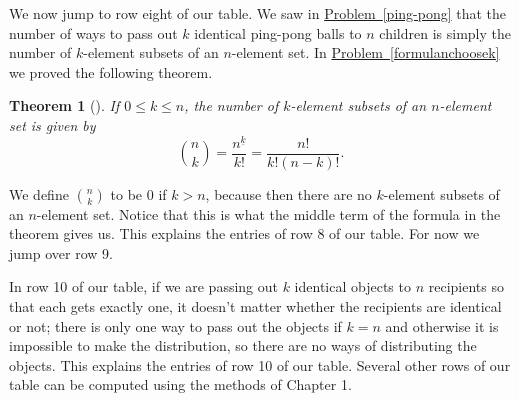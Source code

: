 \documentclass[10pt,]{book}
\theoremstyle{plain}
\newtheorem{theorem}{Theorem}[section]
\theoremstyle{definition}
\numberwithin{equation}{chapter}
\begin{document}
\par
We now jump to row eight of our table. We saw in \hyperref[ping-pong]{Problem~\ref{ping-pong}} that the number of ways to pass out \(k\) identical ping-pong balls to \(n\) children is simply the number of \(k\)-element subsets of an \(n\)-element set. In \hyperref[formulanchoosek]{Problem~\ref{formulanchoosek}} we proved the following theorem.%
\begin{theorem}[{}]\label{theorem-5}
If \(0\le k \le n\), the number of \(k\)-element subsets of an \(n\)-element set is given by%
\begin{equation*}
\binom{n}{k} = \frac{n^{\underline{k}}}{k!}
= \frac{n!}{k!(n-k)!}.
\end{equation*}
%
\end{theorem}
We define \(\binom{n}{k}\) to be 0 if \(k>n\), because then there are no \(k\)-element subsets of an \(n\)-element set. Notice that this is what the middle term of the formula in the theorem gives us. This explains the entries of row 8 of our table. For now we jump over row 9.%
\par
In row 10 of our table, if we are passing out \(k\) identical objects to \(n\) recipients so that each gets exactly one, it doesn't matter whether the recipients are identical or not; there is only one way to pass out the objects if \(k=n\) and otherwise it is impossible to make the distribution, so there are no ways of distributing the objects. This explains the entries of row 10 of our table. Several other rows of our table can be computed using the methods of Chapter 1.%
\typeout{************************************************}
\typeout{************************************************}
\end{document}
